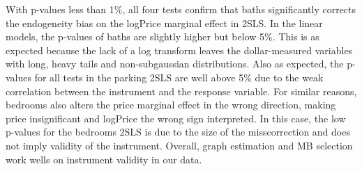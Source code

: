 \documentclass[11pt,review,authoryear]{elsarticle}
\begin{document}
\begin{table}[H]
  \centering
  \caption{Classical tests of instruments in the linear and log regressions}
  \label{table:instrument_test}
\end{table}

With p-values less than 1\%, all four tests confirm that baths significantly corrects the endogeneity bias on the logPrice marginal effect in 2SLS. In the linear models, the p-values of baths are slightly higher but below 5\%. This is as expected because the lack of a log transform leaves the dollar-measured variables with long, heavy tails and non-subgaussian distributions. Also as expected, the p-values for all tests in the parking 2SLS are well above 5\% due to the weak correlation between the instrument and the response variable. \textcolor[rgb]{0.00,0.00,1.00}{For similar reasons, bedrooms also alters the price marginal effect in the wrong direction, making price insignificant and logPrice the wrong sign interpreted. In this case, the low p-values for the bedrooms 2SLS is due to the size of the misscorrection and does not imply validity of the instrument.} Overall, graph estimation and MB selection work wells on instrument validity in our data.
\end{document}
